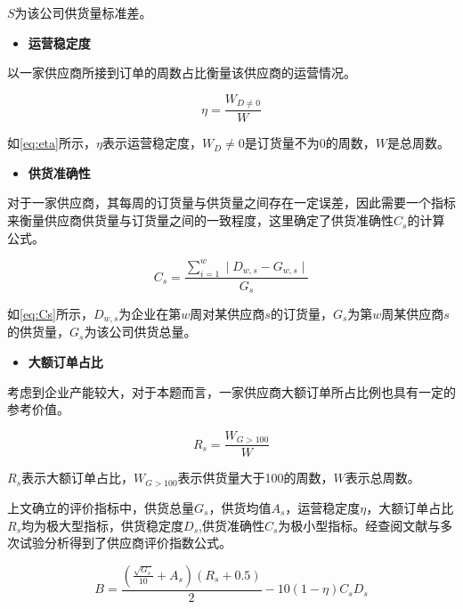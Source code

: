 \documentclass[withoutpreface,bwprint]{cumcmthesis} %
\begin{document}
$S$为该公司供货量标准差。

\begin{itemize}
    \item \textbf{运营稳定度}
\end{itemize}

以一家供应商所接到订单的周数占比衡量该供应商的运营情况。

\begin{equation}
\eta=\frac{W_{D\neq0}}{W}
\label{eq:eta}
\end{equation}

如\cref{eq:eta}所示，$\eta$表示运营稳定度，$W_D\neq0$是订货量不为0的周数，$W$是总周数。

\begin{itemize}
    \item \textbf{供货准确性}
\end{itemize}

对于一家供应商，其每周的订货量与供货量之间存在一定误差，因此需要一个指标来衡量供应商供货量与订货量之间的一致程度，这里确定了供货准确性$C_s$的计算公式。

\begin{equation}
C_s=\frac{\sum_{i=1}^w\mid D_{w,s}-G_{w,s}\mid}{G_s}
\label{eq:Cs}
\end{equation}

如\cref{eq:Cs}所示，$D_{w,s}$为企业在第$w$周对某供应商$s$的订货量，$G_s$为第$w$周某供应商$s$的供货量，$G_s$为该公司供货总量。

\begin{itemize}
    \item \textbf{大额订单占比}
\end{itemize}

考虑到企业产能较大，对于本题而言，一家供应商大额订单所占比例也具有一定的参考价值。

\begin{equation}
R_s=\frac{W_{G>100}}{W}
\label{eq:Rs}
\end{equation}

$R_s$表示大额订单占比，$W_{G>100}$表示供货量大于100的周数，$W$表示总周数。


上文确立的评价指标中，供货总量$G_s$，供货均值$A_s$，运营稳定度$\eta$，大额订单占比$R_s$均为极大型指标，供货稳定度$D_s$,供货准确性$C_s$为极小型指标。经查阅文献与多次试验分析得到了供应商评价指数公式。

\begin{equation}
B=\frac{(\frac{\sqrt{G_s}}{10}+A_s)(R_s+0.5)}{2}-10(1-\eta)C_sD_s
\label{eq:B}
\end{equation}
\end{document}
